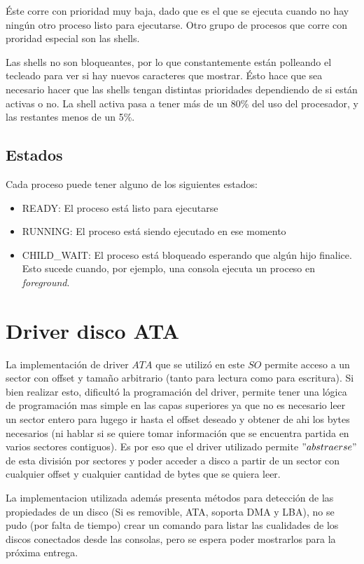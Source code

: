 \documentclass[english]{article}
\begin{document}
Éste corre con prioridad muy baja, dado que es el que se ejecuta cuando no hay ningún otro proceso listo para ejecutarse. Otro grupo de procesos que corre con proridad especial son las shells.

Las shells no son bloqueantes, por lo que constantemente están polleando el tecleado para ver si hay nuevos caracteres que mostrar. Ésto hace que sea necesario hacer que las shells tengan distintas prioridades dependiendo de si están activas o no. La shell activa pasa a tener más de un 80\% del uso del procesador, y las restantes menos de un 5\%.

\subsection{Estados}
Cada proceso puede tener alguno de los siguientes estados:
\begin{itemize}
\item READY: El proceso está listo para ejecutarse
\item RUNNING: El proceso está siendo ejecutado en ese momento
\item CHILD\_WAIT: El proceso está bloqueado esperando que algún hijo finalice. Esto sucede cuando, por ejemplo, una consola ejecuta un proceso en \emph{foreground}.
\end{itemize}

\section{Driver disco ATA}

La implementación de driver $ATA$ que se utilizó en este $SO$ permite
acceso a un sector con offset y tamaño arbitrario (tanto para lectura
como para escritura). Si bien realizar esto, dificultó la programación
del driver, permite tener una lógica de programación mas simple en
las capas superiores ya que no es necesario leer un sector entero
para lugego ir hasta el offset deseado y obtener de ahi los bytes
necesarios (ni hablar si se quiere tomar información que se encuentra
partida en varios sectores contiguos). Es por eso que el driver utilizado
permite $"abstraerse"$ de esta división por sectores y poder acceder
a disco a partir de un sector con cualquier offset y cualquier cantidad
de bytes que se quiera leer.

La implementacion utilizada además presenta métodos para detección
de las propiedades de un disco (Si es removible, ATA, soporta DMA
y LBA), no se pudo (por falta de tiempo) crear un comando para listar
las cualidades de los discos conectados desde las consolas, pero se
espera poder mostrarlos para la próxima entrega.
\end{document}
